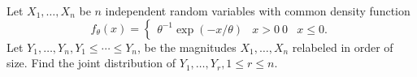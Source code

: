 Let $X_1, \ldots, X_n$ be $n$ independent random variables with common density function
$$f_\theta(x) = \begin{cases} \theta^{-1} \exp(-x/\theta) & x > 0 \ 0 & x \leq 0. \end{cases}$$
Let $Y_1, \ldots, Y_n, Y_1 \leq \cdots \leq Y_n$, be the magnitudes $X_1, \ldots, X_n$ relabeled in order of size. Find the joint distribution of $Y_1, \ldots, Y_r, 1 \leq r \leq n$.
